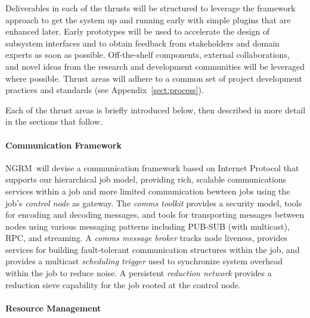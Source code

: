 \documentclass{article}
\newcommand{\ngrm}{NGRM}
\begin{document}
Deliverables in each of the thrusts will be structured 
to leverage the framework approach to get the system up and running
early with simple plugins that are enhanced later.
Early prototypes will be used to accelerate the design of subsystem
interfaces and to obtain feedback from stakeholders and domain experts
as soon as possible.
Off-the-shelf components, external collaborations, and novel ideas from
the research and development communities will be leveraged where possible.
Thrust areas will adhere to a common set of project development practices
and standards (see Appendix~\ref{sect:process}).

Each of the thrust areas is briefly introduced below, then described in
more detail in the sections that follow.

\paragraph{Communication Framework}
\ngrm\ will devise a communication framework based on Internet Protocol
that supports our hierarchical job model, providing rich, scalable
communications services
within a job and more limited communication bewteen jobs using
the job's {\em control node} as gateway.
The {\em comms toolkit} provides a security model, tools for
encoding and decoding messages, and tools for transporting messages between
nodes using various messaging patterns including PUB-SUB (with multicast),
RPC, and streaming.
A {\em comms message broker} tracks node liveness, provides services for
building fault-tolerant communication structures within the job,
and provides a multicast {\em scheduling trigger} used to synchronize
system overhead within the job to reduce noise.
A persistent {\em reduction network}
provides a reduction sieve capability for the job rooted at the control node.

\paragraph{Resource Management}
\end{document}
